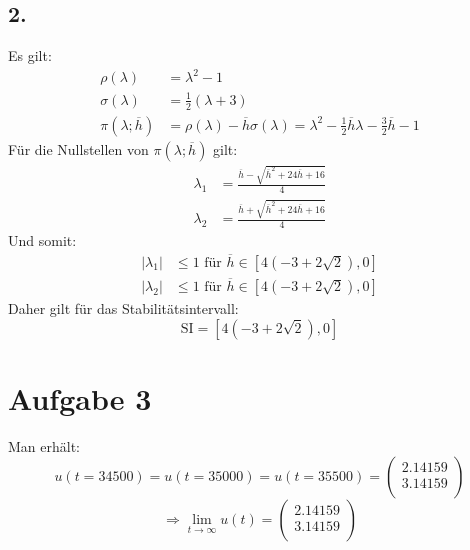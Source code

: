 \documentclass[10pt,oneside,a4paper]{scrartcl}
\begin{document}
    \subsection*{2.}
    Es gilt:
    \begin{align*}
        \rho(\lambda) &= \lambda^2 - 1 \\
        \sigma(\lambda) &= \frac{1}{2}(\lambda + 3) \\
        \pi(\lambda; \overline{h}) &= \rho(\lambda) -
        \overline{h}\sigma(\lambda) = \lambda^2 - \frac{1}{2}\overline{h}\lambda
        - \frac{3}{2}\overline{h} - 1
    \end{align*}
    Für die Nullstellen von $\pi(\lambda; \overline{h})$ gilt:
    \begin{align*}
        \lambda_1 & = \frac{\overline{h} - \sqrt{\overline{h}^2 +
        24\overline{h} + 16}}{4} \\
        \lambda_2 & = \frac{\overline{h} + \sqrt{\overline{h}^2 +
        24\overline{h} + 16}}{4}
    \end{align*}
    Und somit:
        \begin{align*}
        |\lambda_1| &\leq 1 \text{ für } \overline{h} \in [4(-3 + 2 \sqrt{2}),
        0]
        \\
        |\lambda_2| &\leq 1 \text{ für } \overline{h} \in [4(-3 + 2 \sqrt{2}),
        0]
    \end{align*}
    Daher gilt für das Stabilitätsintervall:
    \begin{equation*}
        \text{SI} = [4(-3 + 2 \sqrt{2}), 0]
    \end{equation*}
    
    \section*{Aufgabe 3}
    Man erhält:
    \begin{equation*}
        u(t = 34500) = u(t = 35000) = u(t = 35500) =  
        \begin{pmatrix}
            2.14159\\
            3.14159\\
        \end{pmatrix}
    \end{equation*}
    \begin{equation*}
        \Rightarrow
        \lim\limits_{t \rightarrow \infty}{u(t)} = 
        \begin{pmatrix}
            2.14159\\
            3.14159\\
        \end{pmatrix}
    \end{equation*}
\end{document}
